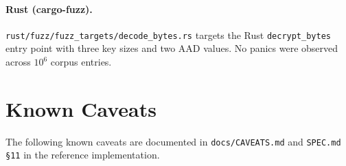 \documentclass[11pt,a4paper]{article}
\begin{document}
\paragraph{Rust (cargo-fuzz).}
\texttt{rust/fuzz/fuzz\_targets/decode\_bytes.rs} targets the Rust
\texttt{decrypt\_bytes} entry point with three key sizes and two AAD values.
No panics were observed across $10^6$ corpus entries.

\section{Known Caveats}
\label{sec:caveats}

The following known caveats are documented in \texttt{docs/CAVEATS.md} and
\texttt{SPEC.md \S11} in the reference implementation.
\end{document}

